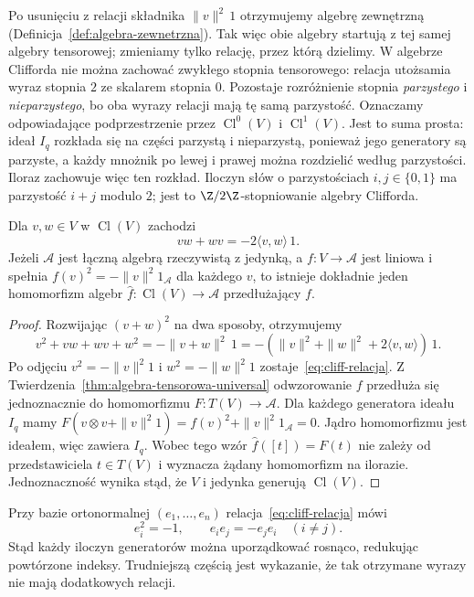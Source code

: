 Po usunięciu z relacji składnika $\|v\|^2\,1$
otrzymujemy algebrę zewnętrzną
(Definicja~\ref{def:algebra-zewnetrzna}).
Tak więc obie algebry startują z tej samej algebry
tensorowej; zmieniamy tylko relację, przez którą
dzielimy. W algebrze Clifforda nie można zachować
zwykłego stopnia tensorowego: relacja utożsamia
wyraz stopnia $2$ ze skalarem stopnia $0$.
Pozostaje rozróżnienie stopnia \emph{parzystego}
i \emph{nieparzystego}, bo oba wyrazy relacji
mają tę samą parzystość.
Oznaczamy odpowiadające podprzestrzenie przez
$\operatorname{Cl}^0(V)$ i $\operatorname{Cl}^1(V)$.
Jest to suma prosta: ideał $I_q$ rozkłada się na części
parzystą i nieparzystą, ponieważ jego generatory są parzyste,
a każdy mnożnik po lewej i prawej można rozdzielić
według parzystości. Iloraz zachowuje więc ten rozkład.
Iloczyn słów o parzystościach $i,j\in\{0,1\}$
ma parzystość $i+j$ modulo $2$; jest to
$\Z/2\Z$-stopniowanie algebry Clifforda.

\begin{twierdzenie}
\label{thm:cliff-relacje}
Dla $v,w\in V$ w $\operatorname{Cl}(V)$ zachodzi
\begin{equation}\label{eq:cliff-relacja}
 vw+wv=-2\langle v,w\rangle\,1.
\end{equation}
Jeżeli $\mathcal A$ jest łączną algebrą rzeczywistą
z jedynką, a $f:V\to\mathcal A$ jest liniowa i spełnia
$f(v)^2=-\|v\|^2 1_{\mathcal A}$ dla każdego $v$,
to istnieje dokładnie jeden homomorfizm algebr
$\widehat f:\operatorname{Cl}(V)\to\mathcal A$
przedłużający $f$.
\end{twierdzenie}
\begin{proof}
Rozwijając $(v+w)^2$ na dwa sposoby, otrzymujemy
\[
 v^2+vw+wv+w^2=-\|v+w\|^2\,1
  =-(\|v\|^2+\|w\|^2+2\langle v,w\rangle)\,1.
\]
Po odjęciu $v^2=-\|v\|^2 1$ i
$w^2=-\|w\|^2 1$ zostaje~\eqref{eq:cliff-relacja}.
Z Twierdzenia~\ref{thm:algebra-tensorowa-universal}
odwzorowanie $f$ przedłuża się jednoznacznie do homomorfizmu
$F:T(V)\to\mathcal A$. Dla każdego generatora ideału
$I_q$ mamy
$F(v\otimes v+\|v\|^2 1)
 =f(v)^2+\|v\|^2 1_{\mathcal A}=0$.
Jądro homomorfizmu jest ideałem, więc zawiera $I_q$.
Wobec tego wzór $\widehat f([t])=F(t)$
nie zależy od przedstawiciela $t\in T(V)$
i wyznacza żądany homomorfizm na ilorazie.
Jednoznaczność wynika stąd, że $V$ i jedynka
generują $\operatorname{Cl}(V)$.
\end{proof}

Przy bazie ortonormalnej $(e_1,\ldots,e_n)$
relacja~\eqref{eq:cliff-relacja} mówi
\begin{equation}\label{eq:cliff-orto}
 e_i^2=-1,\qquad e_ie_j=-e_je_i\quad(i\ne j).
\end{equation}
Stąd każdy iloczyn generatorów można uporządkować
rosnąco, redukując powtórzone indeksy.
Trudniejszą częścią jest wykazanie, że tak otrzymane
wyrazy nie mają dodatkowych relacji.

